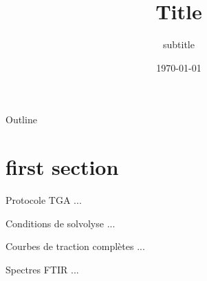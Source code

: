 \documentclass{Styles/beamer-style}
\author[F. Clinquart]{}
\title{Title}
\subtitle{subtitle}
\date{\today}
\begin{document}
\begin{frame}
    \titlepage
\end{frame}

\begin{frame}{Outline}
    \tableofcontents
\end{frame}

\section[first section]{first section}
   


\appendixbib

\begin{frame}{Protocole TGA}
  ...
\end{frame}
\begin{frame}{Conditions de solvolyse}
  ...
\end{frame}

\begin{frame}{Courbes de traction complètes}
  ...
\end{frame}

\begin{frame}{Spectres FTIR}
  ...
\end{frame}
\end{document}
